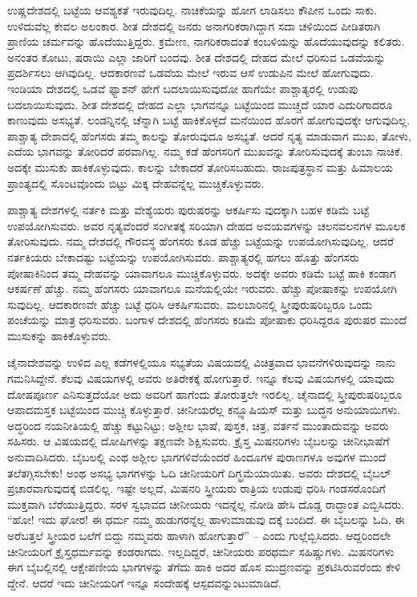 ಉಷ್ಣದೇಶದಲ್ಲಿ ಬಟ್ಟೆಯ ಆವಶ್ಯಕತೆ ಇರುವುದಿಲ್ಲ. ನಾಚಿಕೆಯನ್ನು ಹೋಗ ಲಾಡಿಸಲು ಕೌಪೀನ ಒಂದು ಸಾಕು. ಉಳಿದುವೆಲ್ಲ ಕೇವಲ ಅಲಂಕಾರ. ಶೀತ ದೇಶದಲ್ಲಿ ಜನರು ಅನಾಗರಿಕರಾಗಿದ್ದಾಗ ಸದಾ ಚಳಿಯಿಂದ ಪೀಡಿತರಾಗಿ ಪ್ರಾಣಿಯ ಚರ್ಮವನ್ನು ಹೊದೆಯುತ್ತಿದ್ದರು. ಕ್ರಮೇಣ, ನಾಗರಿಕರಾದಂತೆ ಕಂಬಳಿಯನ್ನು ಹೊದೆಯುವುದನ್ನು ಕಲಿತರು. ಅನಂತರ ಕೋಟು, ಷರಾಯಿ ಎಲ್ಲಾ ಜಾರಿಗೆ ಬಂದವು. ಶೀತ ದೇಶದಲ್ಲಿ ದೇಹದ ಮೇಲೆ ಧರಿಸುವ ಒಡವೆಯನ್ನು ಪ್ರದರ್ಶಿಸಲು ಆಗಿವುದಿಲ್ಲ. ಆದಕಾರಣವೆ ಒಡವೆಯ ಮೇಲೆ ಇರುವ ಆಸೆ ಉಡುಪಿನ ಮೇಲೆ ಹೋಗುವುದು. ಇಂಡಿಯಾ ದೇಶದಲ್ಲಿ ಒಡವೆ ಫ್ಯಾಶನ್​ ಹೇಗೆ ಬದಲಾಯಿಸುವುದೋ ಹಾಗೆಯೇ ಪಾಶ್ಚಾತ್ಯರಲ್ಲಿ ಉಡುಪು ಬದಲಾಯಿಸುವುದು. ಶೀತ ದೇಶದಲ್ಲಿ ದೇಹದ ಎಲ್ಲಾ ಭಾಗವನ್ನೂ ಬಟ್ಟೆಯಿಂದ ಮುಚ್ಚದೆ ಯಾರ ಎದುರಿಗಾದರೂ ಕಾಣುವುದು ಅಸಭ್ಯತೆ. ಲಂಡನ್ನಿನಲ್ಲಿ ಚೆನ್ನಾಗಿ ಬಟ್ಟೆ ಹಾಕಿಕೊಳ್ಳದೆ ಮನೆಯಿಂದ ಹೊರಗೆ ಹೋಗುವುದಕ್ಕೇ ಆಗುವುದಿಲ್ಲ. ಪಾಶ್ಚಾತ್ಯ ದೇಶಾದಲ್ಲಿ ಹೆಂಗಸರು ತಮ್ಮ ಕಾಲನ್ನು ತೋರುವುದೂ ಅಸಭ್ಯತೆ. ಆದರೆ ನೃತ್ಯ ಮಾಡುವಾಗ ಮುಖ, ತೋಳು, ಎದೆಯ ಭಾಗವನ್ನು ತೋರಿದರೆ ಪರವಾಗಿಲ್ಲ. ನಮ್ಮ ಕಡೆ ಹೆಂಗಸರಿಗೆ ಮುಖವನ್ನು ತೋರಿಸುವುದಕ್ಕೆ ತುಂಬಾ ನಾಚಿಕೆ. ಅದಕ್ಕೇ ಮುಸುಕು ಹಾಕಿಕೊಳ್ಳುವುದು. ಕಾಲನ್ನು ಬೇಕಾದರೆ ತೋರಿಸಬಹುದು. ರಾಜಪುತ್ರಸ್ಥಾನ ಮತ್ತು ಹಿಮಾಲಯ ಪ್ರಾಂತ್ಯದಲ್ಲಿ ಸೊಂಟವೊಂದು ಬಿಟ್ಟು ಮಿಕ್ಕ ದೇಹವನ್ನೆಲ್ಲ ಮುಚ್ಚಿಕೊಳ್ಳುವರು.

ಪಾಶ್ಚಾತ್ಯ ದೇಶಗಳಲ್ಲಿ ನರ್ತಕಿ ಮತ್ತು ವೇಶ್ಯೆಯರು ಪುರುಷರನ್ನು ಆಕರ್ಷಿಸು ವುದಕ್ಕಾಗಿ ಬಹಳ ಕಡಿಮೆ ಬಟ್ಟೆ ಉಪಯೋಗಿಸುವರು. ಅವರ ನೃತ್ಯವೆಂದರೆ ಸಂಗೀತಕ್ಕೆ ಸರಿಯಾಗಿ ದೇಹದ ಅವಯವಗಳನ್ನು ಚಲನವಲನಗಳ ಮೂಲಕ ತೋರಿಸುವುದು. ನಮ್ಮ ದೇಶದಲ್ಲಿ ಗೌರವಸ್ಥ ಹೆಂಗಸರು ಕೂಡ ಹೆಚ್ಚು ಬಟ್ಟೆಯನ್ನು ಉಪಯೋಗಿಸುವುದಿಲ್ಲ. ಆದರೆ ನರ್ತಕಿಯರು ಬೇಕಾದಷ್ಟು ಬಟ್ಟೆಯನ್ನು ಉಪಯೋಗಿಸುವರು. ಪಾಶ್ಚಾತ್ಯರಲ್ಲಿ ಹಗಲು ಹೊತ್ತು ಹೆಂಗಸರು ಪೋಷಾಕಿನಿಂದ ತಮ್ಮ ದೇಹವನ್ನು ಯಾವಾಗಲೂ ಮುಚ್ಚಿಕೊಳ್ಳುವರು. ಅದಕ್ಕೇ ಅವರು ಕಡಿಮೆ ಬಟ್ಟೆ ಹಾಕಿ ಕಂಡಾಗ ಆಕರ್ಷಣೆ ಹೆಚ್ಚು. ನಮ್ಮ ಹೆಂಗಸರು ಯಾವಾಗಲೂ ಮನೆಯಲ್ಲಿಯೇ ಇರುವರು. ಹೆಚ್ಚು ಪೋಷಾಕನ್ನು ಉಪಯೋಗಿ ಸುವುದಿಲ್ಲ. ಆದಕಾರಣವೇ ಹೆಚ್ಚು ಬಟ್ಟೆ ಧರಿಸಿ ಆಕರ್ಷಿಸುವರು. ಮಲಬಾರಿನಲ್ಲಿ ಸ್ತ್ರೀಪುರುಷರಿಬ್ಬರೂ ಒಂದು ಪಂಚೆಯನ್ನು ಮಾತ್ರ ಧರಿಸುವರು. ಬಂಗಾಳ ದೇಶದಲ್ಲಿ ಹೆಂಗಸರು ಕಡಿಮೆ ಪೋಷಾಕು ಧರಿಸಿದ್ದರೂ ಪುರುಷರ ಮುಂದೆ ಮುಸುಕನ್ನು ಹಾಕಿಕೊಳ್ಳುವರು.

ಚೈನಾದೇಶವನ್ನು ಉಳಿದ ಎಲ್ಲ ಕಡೆಗಳಲ್ಲಿಯೂ ಸಭ್ಯತೆಯ ವಿಷಯದಲ್ಲಿ ವಿಚಿತ್ರವಾದ ಭಾವನೆಗಳಿರುವುದನ್ನು ನಾನು ಗಮನಿಸಿದ್ದೇನೆ. ಕೆಲವು ವಿಷಯಗಳಲ್ಲಿ ಅವರು ಅತಿರೇಕಕ್ಕೆ ಹೋಗುತ್ತಾರೆ. ಇನ್ನೂ ಕೆಲವು ವಿಷಯಗಳಲ್ಲಿ ಯಾವುದು ದೋಷಪೂರ್ಣ ಎನಿಸುತ್ತದೆಯೋ ಅದು ಅವರಿಗೆ ಹಾಗೆಂದು ತೋರುತ್ತಲೇ ಇರಲಿಲ್ಲ. ಚೈನಾದಲ್ಲಿ ಸ್ತ್ರೀಪುರುಷರಿಬ್ಬರೂ ಆಪಾದಮಸ್ತಕ ಬಟ್ಟೆಯಿಂದ ಮುಚ್ಚಿ ಕೊಳ್ಳುತ್ತಾರೆ. ಚೀನೀಯರೆಲ್ಲ ಕನ್ಫ್ಯೂಷಿಯಸ್​ ಮತ್ತು ಬುದ್ಧನ ಅನುಯಾಯಿಗಳು. ಅದ್ಧರಿಂದ ನಯನೀತಿಯಲ್ಲಿ ಹೆಚ್ಚು ಕಟ್ಟುನಿಟ್ಟು; ಅಶ್ಲೀಲ ಭಾಷೆ, ಪುಸ್ತಕ, ಚಿತ್ರ, ವರ್ತನೆ ಮುಂತಾದುವನ್ನು ಅವರು ಸಹಿಸರು. ಆ ವಿಷಯದಲ್ಲಿ ದೋಷಿಗಳನ್ನು ತಕ್ಷಣವೇ ಶಿಕ್ಷಿಸುವರು. ಕ್ರೈಸ್ತ ಮಿಷನರಿಗಳು ಬೈಬಲನ್ನು ಚೀನೀಭಾಷೆಗೆ ಅನುವಾದಿಸಿದರು. ಬೈಬಲಲ್ಲಿ ಎಂಥ ಅಶ್ಲೀಲ ಭಾಗಗಳಿವೆಯೆಂದರೆ ಹಿಂದೂಗಳ ಪುರಾಣಗಳೂ ಅವುಗಳ ಮುಂದೆ ತಲೆತಗ್ಗಿಸಬೇಕು! ಅಂಥ ಅಸಭ್ಯ ಭಾಗಗಳನ್ನು ಓದಿ ಚೀನೀಯರಿಗೆ ದಿಗ್ಭ್ರಮೆಯಾಯಿತು. ಅವರು ದೇಶದಲ್ಲಿ ಬೈಬಲ್​ ಪ್ರಚಾರವಾಗುವುದಕ್ಕೆ ಬಿಡಲಿಲ್ಲ. ಇಷ್ಟೇ ಅಲ್ಲದೆ, ಮಿಷನರಿ ಸ್ತ್ರೀಯರು ರಾತ್ರಿಯ ಉಡುಪು ಧರಿಸಿ ಗಂಡಸರೊಂದಿಗೆ ಮುಕ್ತವಾಗಿ ಬೆರೆಯುತ್ತಿದ್ದರು. ಸರಳ ಸ್ವಭಾವದ ಚೀನೀಯರು ಇದನ್ನೆಲ್ಲ ನೋಡಿ ಹೇಸಿ ದೊಡ್ಡ ರಾದ್ಧಾಂತ ಎಬ್ಬಿಸಿದರು. “ಹೋ! ಇದು ಘೋರ! ಈ ಧರ್ಮ ನಮ್ಮ ಹುಡುಗರನ್ನೆಲ್ಲ ಹಾಳುಮಾಡುವು ದಕ್ಕೆ ಬಂದಿದೆ. ಈ ಬೈಬಲನ್ನು ಓದಿ, ಈ ಅರೆಬತ್ತಲೆ ಸ್ತ್ರೀಯರ ಬಲೆಗೆ ಬಿದ್ದು ನಮ್ಮವರು ಹಾಳಾಗಿ ಹೋಗುತ್ತಾರೆ” – ಎಂದು ಗುಲ್ಲೆಬ್ಬಿಸಿದರು. ಆದ್ದರಿಂದಲೇ ಚೀನೀಯರಿಗೆ ಕ್ರೈಸ್ತಧರ್ಮವನ್ನು ಕಂಡರಾಗದು. ಇಲ್ಲದಿದ್ದರೆ, ಚೀನೀಯರು ಪರಧರ್ಮ ಸಹಿಷ್ಣುಗಳು. ಮಿಷನರಿಗಳು ಈಗ ಬೈಬಲ್ಲಿನಲ್ಲಿ ಆಕ್ಷೇಪಣೀಯ ಭಾಗಗಳನ್ನು ತೆಗೆದು ಹಾಕಿ ಅದರ ಹೊಸ ಮುದ್ರಣವನ್ನು ಪ್ರಕಟಿಸಿರುವರೆಂದು ಕೇಳಿ ದ್ದೇನೆ. ಆದರೆ ಇದು ಚೀನೀಯರಿಗೆ ಇನ್ನೂ ಸಂದೇಹಕ್ಕೆ ಆಸ್ಪದವನ್ನುಂಟುಮಾಡಿದೆ.


